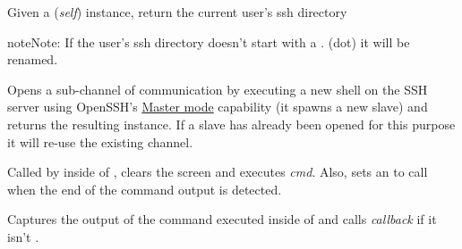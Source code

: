 \documentclass[letterpaper,10pt,openany]{sphinxmanual}
\begin{document}

\begin{fulllineitems}
\label{Applications/terminal/plugin_ssh:ssh.get_ssh_dir}
Given a  (\emph{self}) instance, return the
current user's ssh directory

\begin{notice}{note}{Note:}
If the user's ssh directory doesn't start with a . (dot) it will be renamed.
\end{notice}

\end{fulllineitems}


\begin{fulllineitems}
\label{Applications/terminal/plugin_ssh:ssh.open_sub_channel}
Opens a sub-channel of communication by executing a new shell on the SSH
server using OpenSSH's \href{http://en.wikibooks.org/wiki/OpenSSH/Cookbook/Multiplexing}{Master mode}
capability (it spawns a new slave) and returns the resulting
 instance.  If a slave has already been opened for
this purpose it will re-use the existing channel.

\end{fulllineitems}


\begin{fulllineitems}
\label{Applications/terminal/plugin_ssh:ssh.wait_for_prompt}
Called by  inside of {\hyperref[Applications/terminal/plugin_ssh:ssh.execute_command]{}},
clears the screen and executes \emph{cmd}.  Also, sets an
 to call {\hyperref[Applications/terminal/plugin_ssh:ssh.get_cmd_output]{}} when the
end of the command output is detected.

\end{fulllineitems}


\begin{fulllineitems}
\label{Applications/terminal/plugin_ssh:ssh.get_cmd_output}
Captures the output of the command executed inside of
{\hyperref[Applications/terminal/plugin_ssh:ssh.wait_for_prompt]{}} and calls \emph{callback} if it isn't .

\end{fulllineitems}
\end{document}
